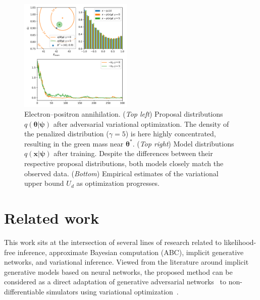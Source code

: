 \documentclass[twocolumn,superscriptaddress,aps]{revtex4-1}
\newcommand{\qxpsi}{q(\mathbf{x}|\bfpsi)}
\newcommand{\bftheta}{{\bm \theta}}
\newcommand{\bfpsi}{{\bm \psi}}
\theoremstyle{plain}
\begin{document}
\begin{figure}
    \centering
    \includegraphics[width=0.48\textwidth]{figures/weinberg.pdf}
    \caption{Electron--positron annihilation.
    ({\it Top left}) Proposal distributions $q(\bftheta|\bfpsi)$ after adversarial variational optimization. The density of the penalized distribution ($\gamma=5$) is here highly concentrated, resulting in the green mass near $\bftheta^*$.
    ({\it Top right}) Model distributions $\qxpsi$ after training. Despite the differences between their respective proposal distributions, both models closely match the observed data.
    ({\it Bottom}) Empirical estimates of the variational upper bound $U_d$ as optimization progresses.
             }\label{fig:weinberg}
\end{figure}



\section{Related work}

This work sits at the intersection of several lines of research related to 
likelihood-free inference, approximate Bayesian computation (ABC),
implicit generative networks, and variational inference.  
Viewed from the literature around implicit generative models based on neural networks, 
the proposed method can be considered as a direct adaptation of
generative adversarial networks~\citep{goodfellow2014generative,2017arXiv170104862A, 2017arXiv170107875A} to
non-differentiable simulators using variational optimization~\cite{2012arXiv1212.4507S,staines2013optimization}.
\end{document}

